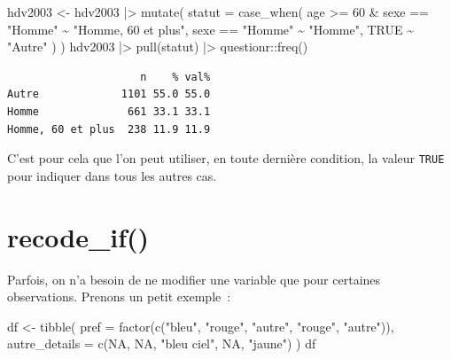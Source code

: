 \documentclass[
  letterpaper,
  DIV=11,
  numbers=noendperiod,
  oneside]{scrreprt}
\newenvironment{Shaded}{\begin{snugshade}}{\end{snugshade}}
\newcommand{\AttributeTok}[1]{\textcolor[rgb]{0.40,0.45,0.13}{#1}}
\newcommand{\ConstantTok}[1]{\textcolor[rgb]{0.56,0.35,0.01}{#1}}
\newcommand{\DecValTok}[1]{\textcolor[rgb]{0.68,0.00,0.00}{#1}}
\newcommand{\FunctionTok}[1]{\textcolor[rgb]{0.28,0.35,0.67}{#1}}
\newcommand{\NormalTok}[1]{\textcolor[rgb]{0.00,0.23,0.31}{#1}}
\newcommand{\OtherTok}[1]{\textcolor[rgb]{0.00,0.23,0.31}{#1}}
\newcommand{\SpecialCharTok}[1]{\textcolor[rgb]{0.37,0.37,0.37}{#1}}
\newcommand{\StringTok}[1]{\textcolor[rgb]{0.13,0.47,0.30}{#1}}
\begin{document}
\begin{tcolorbox}
\begin{Shaded}
\begin{Highlighting}[]
\NormalTok{hdv2003 }\OtherTok{\textless{}{-}}
\NormalTok{  hdv2003 }\SpecialCharTok{|\textgreater{}} 
  \FunctionTok{mutate}\NormalTok{(}
    \AttributeTok{statut =} \FunctionTok{case\_when}\NormalTok{(}
\NormalTok{      age }\SpecialCharTok{\textgreater{}=} \DecValTok{60} \SpecialCharTok{\&}\NormalTok{ sexe }\SpecialCharTok{==} \StringTok{"Homme"} \SpecialCharTok{\textasciitilde{}} \StringTok{"Homme, 60 et plus"}\NormalTok{,}
\NormalTok{      sexe }\SpecialCharTok{==} \StringTok{"Homme"} \SpecialCharTok{\textasciitilde{}} \StringTok{"Homme"}\NormalTok{,}
      \ConstantTok{TRUE} \SpecialCharTok{\textasciitilde{}} \StringTok{"Autre"}
\NormalTok{    )}
\NormalTok{  )}
\NormalTok{hdv2003 }\SpecialCharTok{|\textgreater{}} 
  \FunctionTok{pull}\NormalTok{(statut) }\SpecialCharTok{|\textgreater{}} 
\NormalTok{  questionr}\SpecialCharTok{::}\FunctionTok{freq}\NormalTok{()}
\end{Highlighting}
\end{Shaded}

\begin{verbatim}
                     n    % val%
Autre             1101 55.0 55.0
Homme              661 33.1 33.1
Homme, 60 et plus  238 11.9 11.9
\end{verbatim}

C'est pour cela que l'on peut utiliser, en toute dernière condition, la
valeur \texttt{TRUE} pour indiquer dans tous les autres cas.

\end{tcolorbox}

\hypertarget{recode_if}{%
\section{recode\_if()}\label{recode_if}}

Parfois, on n'a besoin de ne modifier une variable que pour certaines
observations. Prenons un petit exemple~:

\begin{Shaded}
\begin{Highlighting}[]
\NormalTok{df }\OtherTok{\textless{}{-}} \FunctionTok{tibble}\NormalTok{(}
  \AttributeTok{pref =} \FunctionTok{factor}\NormalTok{(}\FunctionTok{c}\NormalTok{(}\StringTok{"bleu"}\NormalTok{, }\StringTok{"rouge"}\NormalTok{, }\StringTok{"autre"}\NormalTok{, }\StringTok{"rouge"}\NormalTok{, }\StringTok{"autre"}\NormalTok{)),}
  \AttributeTok{autre\_details =} \FunctionTok{c}\NormalTok{(}\ConstantTok{NA}\NormalTok{, }\ConstantTok{NA}\NormalTok{, }\StringTok{"bleu ciel"}\NormalTok{, }\ConstantTok{NA}\NormalTok{, }\StringTok{"jaune"}\NormalTok{)}
\NormalTok{)}
\NormalTok{df}
\end{Highlighting}
\end{Shaded}
\end{document}
